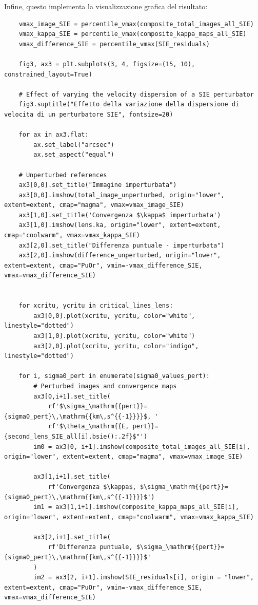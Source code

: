 Infine, questo implementa la visualizzazione grafica del risultato:
\begin{lstlisting}
    vmax_image_SIE = percentile_vmax(composite_total_images_all_SIE)
    vmax_kappa_SIE = percentile_vmax(composite_kappa_maps_all_SIE)
    vmax_difference_SIE = percentile_vmax(SIE_residuals)
    
    fig3, ax3 = plt.subplots(3, 4, figsize=(15, 10), constrained_layout=True)
    
    # Effect of varying the velocity dispersion of a SIE perturbator
    fig3.suptitle("Effetto della variazione della dispersione di velocita di un perturbatore SIE", fontsize=20)
    
    for ax in ax3.flat:
        ax.set_label("arcsec")
        ax.set_aspect("equal")
    
    # Unperturbed references
    ax3[0,0].set_title("Immagine imperturbata")
    ax3[0,0].imshow(total_image_unperturbed, origin="lower", extent=extent, cmap="magma", vmax=vmax_image_SIE)
    ax3[1,0].set_title('Convergenza $\kappa$ imperturbata')
    ax3[1,0].imshow(lens.ka, origin="lower", extent=extent, cmap="coolwarm", vmax=vmax_kappa_SIE)
    ax3[2,0].set_title("Differenza puntuale - imperturbata")
    ax3[2,0].imshow(difference_unperturbed, origin="lower", extent=extent, cmap="PuOr", vmin=-vmax_difference_SIE, vmax=vmax_difference_SIE)
    
       
    for xcritu, ycritu in critical_lines_lens:
        ax3[0,0].plot(xcritu, ycritu, color="white", linestyle="dotted")
        ax3[1,0].plot(xcritu, ycritu, color="white")
        ax3[2,0].plot(xcritu, ycritu, color="indigo", linestyle="dotted")
    
    for i, sigma0_pert in enumerate(sigma0_values_pert):
        # Perturbed images and convergence maps 
        ax3[0,i+1].set_title(
            rf'$\sigma_\mathrm{{pert}}={sigma0_pert}\,\mathrm{{km\,s^{{-1}}}}$, '
            rf'$\theta_\mathrm{{E, pert}}={second_lens_SIE_all[i].bsie():.2f}$"')
        im0 = ax3[0, i+1].imshow(composite_total_images_all_SIE[i], origin="lower", extent=extent, cmap="magma", vmax=vmax_image_SIE)
    
        ax3[1,i+1].set_title(
            rf'Convergenza $\kappa$, $\sigma_\mathrm{{pert}}={sigma0_pert}\,\mathrm{{km\,s^{{-1}}}}$')
        im1 = ax3[1,i+1].imshow(composite_kappa_maps_all_SIE[i], origin="lower", extent=extent, cmap="coolwarm", vmax=vmax_kappa_SIE)
    
        ax3[2,i+1].set_title(
            rf'Differenza puntuale, $\sigma_\mathrm{{pert}}={sigma0_pert}\,\mathrm{{km\,s^{{-1}}}}$'
        )
        im2 = ax3[2, i+1].imshow(SIE_residuals[i], origin = "lower", extent=extent, cmap="PuOr", vmin=-vmax_difference_SIE, vmax=vmax_difference_SIE)
    

\end{lstlisting}
